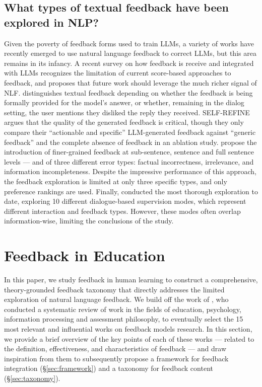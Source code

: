 \subsection{What types of textual feedback have been explored in NLP?}

Given the poverty of feedback forms used to train LLMs, a variety of works have recently emerged to use natural language feedback to correct LLMs, but this area remains in its infancy. A recent survey on how feedback is receive and integrated with LLMs \citep{fernandes_bridging_2023} recognizes the limitation of current score-based approaches to feedback, and proposes that future work should leverage the much richer signal of NLF.  
%
\citet{shi2022life} distinguishes textual feedback depending on whether the feedback is being formally provided for the model's answer, or whether, remaining in the dialog setting, the user mentions they disliked the reply they received. 
%
\textsc{SELF-REFINE} \citep{madaan2023selfrefine} argues that the quality of the generated feedback is critical, though they only compare their ``actionable and specific'' LLM-generated feedback against ``generic feedback'' and the complete absence of feedback in an ablation study.
% 
\citet{wu2023finegrained} propose the introduction of finer-grained feedback at sub-sentence, sentence and full sentence levels --- and of three different error types: factual incorrectness, irrelevance, and information incompleteness. Despite the impressive performance of this approach, the feedback exploration is limited at only three specific types, and only preference rankings are used.
%
Finally, \citet{weston_dialog-based_2016} conducted the most thorough exploration to date, exploring 10 different dialogue-based supervision modes, which represent different interaction and feedback types. However, these modes often overlap information-wise, limiting the conclusions of the study.  



\section{Feedback in Education}
\label{sec:background_pedagogy}

In this paper, we study feedback in human learning to construct a comprehensive, theory-grounded feedback taxonomy that directly addresses the limited exploration of natural language feedback. 
%
We build off the work of \citet{lipnevich_review_2021}, who conducted a systematic review of work in the fields of education, psychology, information processing and assessment philosophy, to eventually select the 15 most relevant and influential works on feedback models research. In this section, we provide a brief overview of the key points of each of these works --- related to the definition, effectiveness, and characteristics of feedback --- and draw inspiration from them to subsequently propose a framework for feedback integration (\S\ref{sec:framework}) and a taxonomy for feedback content (\S\ref{sec:taxonomy}).

